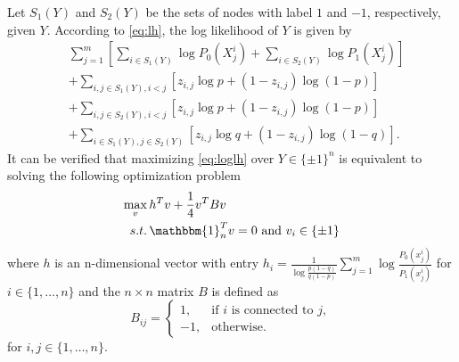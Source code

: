 \documentclass[conference]{IEEEtran}
\begin{document}
	Let $S_1(Y)$ and $S_2(Y)$ be the sets of nodes with label $1$ and $-1$, respectively, given $Y$.
	According to \eqref{eq:lh}, the log likelihood of $Y$ is given by
	\begin{align}\label{eq:loglh}
		&\sum^m_{j=1}[\sum_{i\in S_1(Y)} \log P_0(X^i_{j})+\sum_{i\in S_2(Y)} \log P_1(X^i_{j})]\nonumber\\
		&+\sum_{i,j\in S_1(Y),i<j}[z_{i,j}\log p+(1-z_{i,j})\log (1-p)]\nonumber\\
		&+\sum_{i,j\in S_2(Y),i<j}[z_{i,j}\log p+(1-z_{i,j})\log (1-p)]
		\nonumber\\
		&+\sum_{i\in S_1(Y),j\in S_2(Y)}[z_{i,j}\log q+(1-z_{i,j})\log (1-q)].
	\end{align}
	It can be verified that maximizing \eqref{eq:loglh} over $Y\in\{\pm 1\}^n$ is equivalent to solving the following optimization problem
	\begin{align}
		\max_{v}\, & h^T v + \frac{1}{4}v^T B v \notag \\
		s.t.\, & \mathbbm{1}_n^T v = 0 \text{ and } v_i \in \{\pm 1 \} \label{eq:matrix_mle}
	\end{align}
	where $h$ is an n-dimensional vector with entry $h_i = \frac{1}{\log \frac{p(1-q)}{q(1-p)}}\sum_{j=1}^m \log \frac{P_0(x^i_{j})}{P_1(x^i_{j})}$ for $i\in\{1,\ldots,n\}$ and the $n\times n $ matrix $B$ is defined as
	\begin{equation}
		B_{ij} = \begin{cases}
			1, & \text{if $i$ is connected to $j$}, \\
			-1,& \text{otherwise.}
		\end{cases}
	\end{equation}  
	for $i,j\in\{1,\ldots,n\}$.
	
\end{document}

